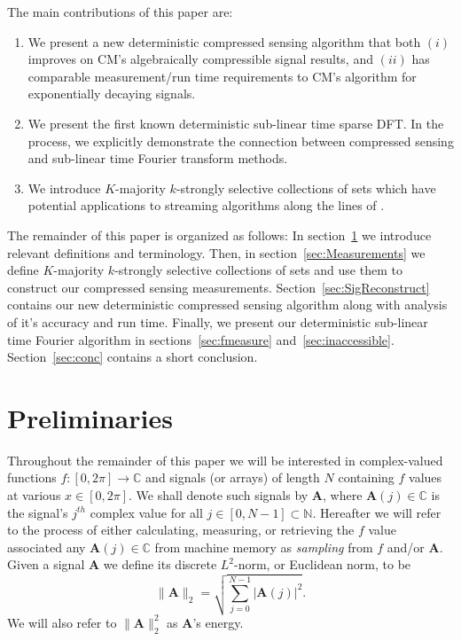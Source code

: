 \documentclass{article}
\begin{document}
The main contributions of this paper are:
\begin{enumerate}
\item We present a new deterministic compressed sensing algorithm that both $(i)$ improves on CM's algebraically compressible signal results, and $(ii)$ has comparable measurement/run time requirements to CM's algorithm for exponentially decaying signals.
\item We present the first known deterministic sub-linear time sparse DFT.  In the process, we explicitly demonstrate the connection between compressed sensing and sub-linear time Fourier transform methods.
\item We introduce $K$-majority $k$-strongly selective collections of sets which have potential applications to streaming algorithms along the lines of \cite{FirstDetCS, Crprecis}.
\end{enumerate}

The remainder of this paper is organized as follows:  In section~\ref{sec:prelim} we introduce relevant definitions and terminology.  Then, in section~\ref{sec:Measurements} we define $K$-majority $k$-strongly selective collections of sets and use them to construct our compressed sensing measurements.  Section~\ref{sec:SigReconstruct} contains our new deterministic compressed sensing algorithm along with analysis of it's accuracy and run time.  Finally, we present our deterministic sub-linear time Fourier algorithm in sections~\ref{sec:fmeasure} and~\ref{sec:inaccessible}.  Section~\ref{sec:conc} contains a short conclusion.

\section{Preliminaries}
\label{sec:prelim}

Throughout the remainder of this paper we will be interested in complex-valued functions $f: [0,2\pi] \rightarrow \mathbb{C}$ and signals (or arrays) of length $N$ containing $f$ values at various $x \in [0,2\pi]$.  We shall denote such signals by $\textbf{A}$, where $\textbf{A}(j) \in \mathbb{C}$ is the signal's $j^{th}$ complex value for all $j \in [0,N-1] \subset \mathbb{N}$.  Hereafter we will refer to the process of either calculating, measuring, or retrieving the $f$ value associated any $\textbf{A}(j) \in \mathbb{C}$ from machine memory as \textit{sampling} from $f$ and/or $\textbf{A}$.  Given a signal $\textbf{A}$ we define 
its discrete $L^{2}$-norm, or Euclidean norm, to be 
$$\| \textbf{A} \|_{2} = \sqrt{\sum_{j=0}^{N-1} |\textbf{A}(j)|^{2}}.$$  
We will also refer to $\| \textbf{A} \|_{2}^{2}$ as $\textbf{A}$'s energy.
\end{document}
